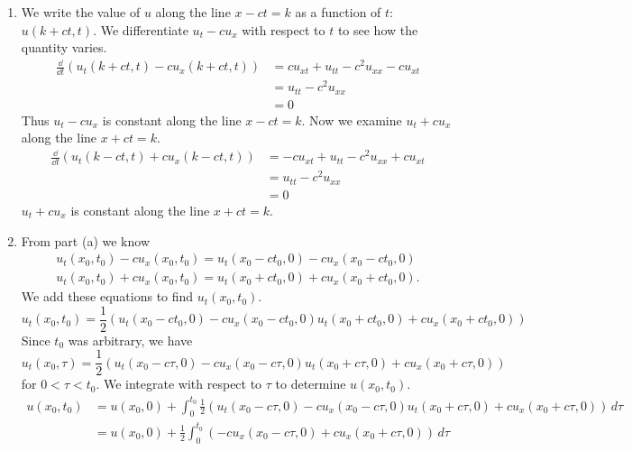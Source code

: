 {%
\begin{Solution}
  \begin{enumerate}
  \item 
    We write the value of $u$ along the line $x - c t = k$ as a function 
    of $t$: $u(k+c t, t)$.  We differentiate $u_t - c u_x$ with respect
    to $t$ to see how the quantity varies.
    \begin{align*}
      \frac{\dd}{\dd t} \left( u_t(k+c t, t) - c u_x(k+c t, t) \right)
      &= c u_{x t} + u_{t t} - c^2 u_{x x} - c u_{x t} \\
      &= u_{t t} - c^2 u_{x x} \\
      &= 0
    \end{align*}
    Thus $u_t - c u_x$ is constant along the line $x - c t = k$.  Now we
    examine $u_t + c u_x$ along the line $x + c t = k$.  
    \begin{align*}
      \frac{\dd}{\dd t} \left( u_t(k-c t, t) + c u_x(k-c t, t) \right)
      &= - c u_{x t} + u_{t t} - c^2 u_{x x} + c u_{x t} \\
      &= u_{t t} - c^2 u_{x x} \\
      &= 0
    \end{align*}
    $u_t + c u_x$ is constant along the line $x + c t = k$. 
  \item 
    From part (a) we know
    \begin{gather*}
      u_t(x_0,t_0) - c u_x(x_0,t_0) = u_t(x_0-c t_0,0) - c u_x(x_0-c t_0,0) \\
      u_t(x_0,t_0) + c u_x(x_0,t_0) = u_t(x_0+c t_0,0) + c u_x(x_0+c t_0,0).
    \end{gather*}
    We add these equations to find $u_t(x_0,t_0)$.
    \[
    u_t(x_0,t_0) = \frac{1}{2} \left( u_t(x_0-c t_0,0) - c u_x(x_0-c t_0,0)
      u_t(x_0+c t_0,0) + c u_x(x_0+c t_0,0) \right)
    \]
    Since $t_0$ was arbitrary, we have
    \[
    u_t(x_0,\tau) = \frac{1}{2} \left( u_t(x_0-c \tau,0) - c u_x(x_0-c \tau,0)
      u_t(x_0+c \tau,0) + c u_x(x_0+c \tau,0) \right)
    \]
    for $0 < \tau < t_0$.  We integrate with respect to $\tau$ to 
    determine $u(x_0,t_0)$.
    \begin{align*}
      u(x_0,t_0) &= u(x_0,0) + \int_0^{t_0} \frac{1}{2} 
      \left( u_t(x_0-c \tau,0) - c u_x(x_0-c \tau,0)
        u_t(x_0+c \tau,0) + c u_x(x_0+c \tau,0) \right)\,d\tau \\
      &= u(x_0,0) + \frac{1}{2} \int_0^{t_0}
      \left( - c u_x(x_0-c \tau,0) + c u_x(x_0+c \tau,0)
      \right)\,d\tau \\

\end{align*}
\end{enumerate}
\end{Solution}}
